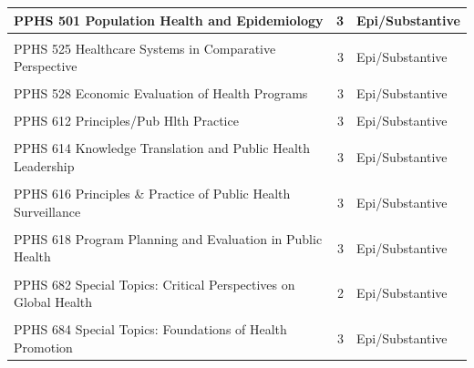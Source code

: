 \documentclass[
  letterpaper,
  DIV=11,
  numbers=noendperiod]{scrreprt}
\begin{document}
\begin{table}
{{\begin{tabular}[t]{l|r|l}
\hline
PPHS 501 Population Health and Epidemiology & 3 & Epi/Substantive\\
\hline
\cellcolor{gray!10}{PPHS 511 Fundamentals of Global Health} & \cellcolor{gray!10}{3} & \cellcolor{gray!10}{Epi/Substantive}\\
\hline
PPHS 525 Healthcare Systems in Comparative Perspective & 3 & Epi/Substantive\\
\hline
\cellcolor{gray!10}{PPHS 527 Economics for Health Services Research and Policy} & \cellcolor{gray!10}{3} & \cellcolor{gray!10}{Epi/Substantive}\\
\hline
PPHS 528 Economic Evaluation of Health Programs & 3 & Epi/Substantive\\
\hline
\cellcolor{gray!10}{PPHS 529 Global Environmental Health and Burden of Disease} & \cellcolor{gray!10}{3} & \cellcolor{gray!10}{Epi/Substantive}\\
\hline
PPHS 612 Principles/Pub Hlth Practice & 3 & Epi/Substantive\\
\hline
\cellcolor{gray!10}{PPHS 613 The Practice of Global Health} & \cellcolor{gray!10}{3} & \cellcolor{gray!10}{Epi/Substantive}\\
\hline
PPHS 614 Knowledge Translation and Public Health Leadership & 3 & Epi/Substantive\\
\hline
\cellcolor{gray!10}{PPHS 615 Intro:Infectious Disease Epid} & \cellcolor{gray!10}{3} & \cellcolor{gray!10}{Epi/Substantive}\\
\hline
PPHS 616 Principles \& Practice of Public Health Surveillance & 3 & Epi/Substantive\\
\hline
\cellcolor{gray!10}{PPHS 617 Impact Evaluation} & \cellcolor{gray!10}{3} & \cellcolor{gray!10}{Epi/Substantive}\\
\hline
PPHS 618 Program Planning and Evaluation in Public Health & 3 & Epi/Substantive\\
\hline
\cellcolor{gray!10}{PPHS 624 Public Health Ethics \& Policy} & \cellcolor{gray!10}{3} & \cellcolor{gray!10}{Epi/Substantive}\\
\hline
PPHS 682 Special Topics: Critical Perspectives on Global Health & 2 & Epi/Substantive\\
\hline
\cellcolor{gray!10}{PPHS 683 Special Topics: Vaccine Epidemiology} & \cellcolor{gray!10}{3} & \cellcolor{gray!10}{Epi/Substantive}\\
\hline
PPHS 684 Special Topics: Foundations of Health Promotion & 3 & Epi/Substantive\\
\hline
\end{tabular}}

}

\end{table}%
\end{document}
